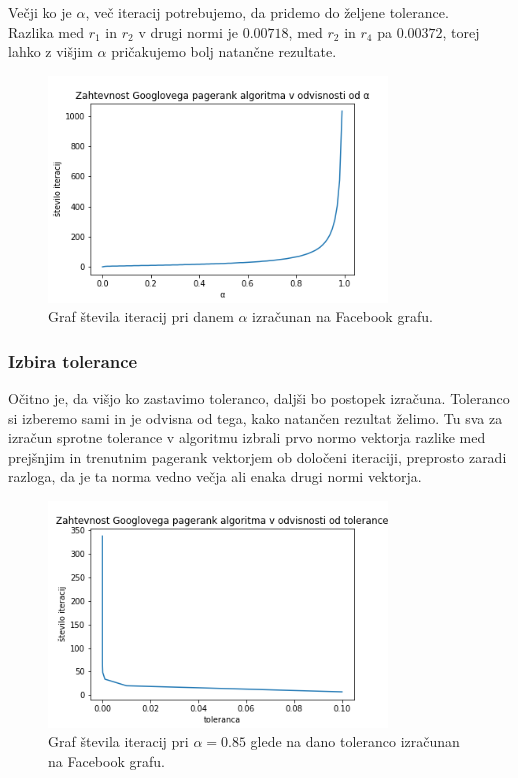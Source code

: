 \documentclass[12pt,a4paper]{amsart}
\begin{document}
Večji ko je $\alpha$, več iteracij potrebujemo, da pridemo do željene tolerance. \\
Razlika med $r_1$ in $r_2$ v drugi normi je $0.00718$, med $r_2$ in $r_4$ pa $0.00372$, torej lahko z višjim $\alpha$ pričakujemo bolj natančne rezultate.  
\begin{figure}[h]
\begin{center} 
\includegraphics[width=9cm]{Pagerank_alpha.png}
\caption[Zahtevnost Googlovega pagerank algoritma glede na $\alpha$]{Graf števila iteracij pri danem $\alpha$ izračunan na Facebook grafu.}
\end{center}
\end{figure}

\subsubsection{Izbira tolerance} 
Očitno je, da višjo ko zastavimo toleranco, daljši bo postopek izračuna. Toleranco si izberemo sami in je odvisna od tega, kako natančen rezultat želimo. Tu sva za izračun sprotne tolerance v algoritmu izbrali prvo normo vektorja razlike med prejšnjim in trenutnim pagerank vektorjem ob določeni iteraciji, preprosto zaradi razloga, da je ta norma vedno večja ali enaka drugi normi vektorja. 
\begin{figure}[h]
\begin{center} 
\includegraphics[width=9cm]{Pagerank_tolerance.png}
	\caption[Zahtevnost Googlovega pagerank algoritma glede na toleranco]{Graf števila iteracij pri $\alpha = 0.85$ glede na dano toleranco izračunan na Facebook grafu.}
\end{center}
\end{figure}
\end{document}
